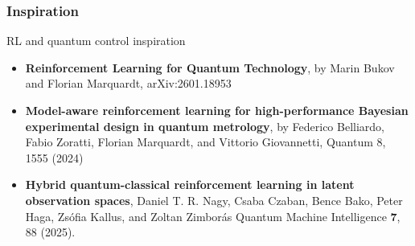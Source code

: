 \documentclass{beamer}
\begin{document}
\begin{frame}
\frametitle{Inspiration}

\begin{alertblock}{RL and quantum control inspiration}
\begin{itemize}
\item {\bf Reinforcement Learning for Quantum Technology}, by Marin Bukov and Florian Marquardt, arXiv:2601.18953
\item {\bf Model-aware reinforcement learning for high-performance Bayesian experimental design in quantum metrology}, by Federico Belliardo, Fabio Zoratti, Florian Marquardt, and Vittorio Giovannetti, Quantum 8, 1555 (2024)
\item {\bf Hybrid quantum-classical reinforcement learning in latent observation spaces}, Daniel T. R. Nagy, Csaba Czaban, Bence Bako, Peter Haga, Zsófia Kallus, and Zoltan Zimborás  Quantum Machine Intelligence {\bf 7}, 88 (2025).
\end{itemize}
\end{alertblock}

\end{frame}
\end{document}
